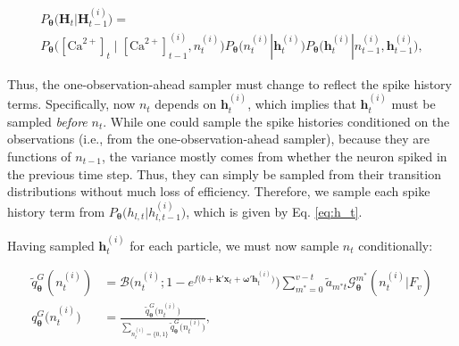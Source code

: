 \documentclass[10pt]{article}
\providecommand{\ve}[1]{\boldsymbol{#1}}
\providecommand{\ve}[1]{\boldsymbol{#1}}
\newcommand{\thetn}{\ve{\theta}}
\newcommand{\p}{P_{\thetn}}
\newcommand{\m}{m^{\ast}}
\newcommand{\Ca}{[\text{Ca}^{2+}]}
\begin{document}
\begin{multline}
\p\big(\ve{H}_t | \ve{H}_{t-1}^{(i)}\big) = \\
\p\big(\Ca_t \mid \Ca_{t-1}^{(i)}, n_t^{(i)}\big) \p\big(n_t^{(i)} | \ve{h}_t^{(i)}\big) \p\big(\ve{h}_t^{(i)} | n_{t-1}^{(i)}, \ve{h}_{t-1}^{(i)}\big),
\end{multline}

\noindent Thus, the one-observation-ahead sampler must change to reflect the spike history terms.  Specifically, now $n_t$ depends on $\ve{h}_t^{(i)}$, which implies that $\ve{h}_t^{(i)}$ must be sampled \emph{before} $n_t$.  While one could sample the spike histories conditioned on the observations (i.e., from the one-observation-ahead sampler), because they are functions of $n_{t-1}$, the variance mostly comes from whether the neuron spiked in the previous time step.  Thus, they can simply be sampled from their transition distributions without much loss of efficiency.  Therefore, we sample each spike history term from $\p\big(h_{l,t} | h_{l,t-1}^{(i)}\big)$, which is given by Eq. \ref{eq:h_t}.

Having sampled $\ve{h}_t^{(i)}$ for each particle, we must now sample $n_t$ conditionally:

%
%
\begin{subequations} \label{aeq:qn1}
\begin{align}
\widetilde{q}_{\thetn}^G(n_t^{(i)})&=\mathcal{B}\bigg(n_t^{(i)}; 1-e^{f\big(b+\ve{k}'\ve{x}_t+\ve{\omega}'\ve{h}_t^{(i)}\big)}\bigg) \sum_{\m=0}^{v-t} \widetilde{a}_{\m t} \mathcal{G}_{\thetn}^{\m}(n_t^{(i)}| F_v)\\
q_{\thetn}^{G}\big(n_t^{(i)}\big)&=\frac{\widetilde{q}_{\thetn}^G\big(n_t^{(i)}\big)}{\sum_{n_t^{(i)}=\{0,1\}} \widetilde{q}_{\thetn}^G\big(n_t^{(i)}\big)},
\end{align}
\end{subequations}
\end{document}
